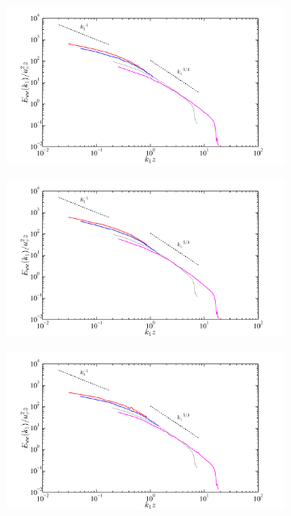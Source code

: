 \begin{figure}[h!]
        \centering
        \begin{subfigure}[t]{0.70\textwidth}
                \includegraphics[width=\linewidth]{Fig2/energy_ABL_n05_filt2.pdf}
                \caption{}
                \label{fig:spec}
        \end{subfigure}
\centering
        \begin{subfigure}[t]{0.70\textwidth}
                \includegraphics[width=\linewidth]{Fig2/energy_ABL_n05_filt4.pdf}
                \caption{}
                \label{fig:spec2}
        \end{subfigure}
\centering
        \begin{subfigure}[t]{0.70\textwidth}
                \includegraphics[width=\linewidth]{Fig2/energy_ABL_n05_filt6.pdf}

\end{subfigure}
\end{figure}
